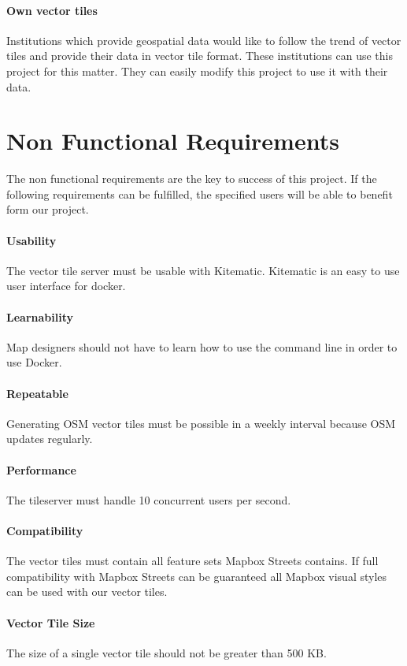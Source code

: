 \paragraph{Own vector tiles}
Institutions which provide geospatial data would like to follow the trend of vector tiles and provide their data in vector tile format. These institutions can use this project for this matter. They can easily modify this project to use it with their data. 

\section{Non Functional Requirements}\label{non_functional_requirements}

The non functional requirements are the key to success of this project. If the following requirements can be fulfilled, the specified users will be able to benefit form our project.

\paragraph{Usability}
The vector tile server must be usable with Kitematic\cite{rs_2_kitematic_2015}. Kitematic is an easy to use user interface for docker. 

\paragraph{Learnability}

Map designers should not have to learn how to use the command line in
order to use Docker.

\paragraph{Repeatable}

Generating OSM vector tiles must be possible in a weekly interval because OSM
updates regularly.

\paragraph{Performance}

The tileserver must handle 10 concurrent users per second.

\paragraph{Compatibility}

The vector tiles must contain all feature sets Mapbox Streets contains. If full compatibility with Mapbox Streets\cite{22_mapbox.com_2015} can be guaranteed all Mapbox visual styles can be used with our vector tiles.

\paragraph{Vector Tile Size}

The size of a single vector tile should not be greater than 500 KB.
